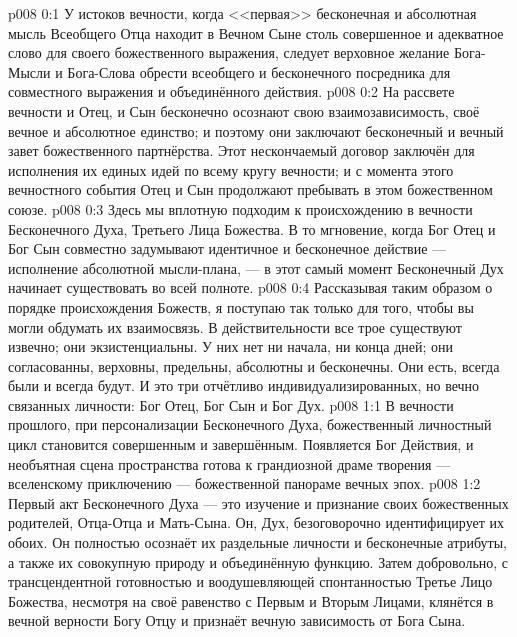 \author{Божественный Советник}
\vs p008 0:1 У истоков вечности, когда <<первая>> бесконечная и абсолютная мысль Всеобщего Отца находит в Вечном Сыне столь совершенное и адекватное слово для своего божественного выражения, следует верховное желание Бога\hyp{}Мысли и Бога\hyp{}Слова обрести всеобщего и бесконечного посредника для совместного выражения и объединённого действия.
\vs p008 0:2 На рассвете вечности и Отец, и Сын бесконечно осознают свою взаимозависимость, своё вечное и абсолютное единство; и поэтому они заключают бесконечный и вечный завет божественного партнёрства. Этот нескончаемый договор заключён для исполнения их единых идей по всему кругу вечности; и с момента этого вечностного события Отец и Сын продолжают пребывать в этом божественном союзе.
\vs p008 0:3 Здесь мы вплотную подходим к происхождению в вечности Бесконечного Духа, Третьего Лица Божества. В то мгновение, когда Бог Отец и Бог Сын совместно задумывают идентичное и бесконечное действие --- исполнение абсолютной мысли\hyp{}плана, --- в этот самый момент Бесконечный Дух начинает существовать во всей полноте.
\vs p008 0:4 \pc Рассказывая таким образом о порядке происхождения Божеств, я поступаю так только для того, чтобы вы могли обдумать их взаимосвязь. В действительности все трое существуют извечно; они экзистенциальны. У них нет ни начала, ни конца дней; они согласованны, верховны, предельны, абсолютны и бесконечны. Они есть, всегда были и всегда будут. И это три отчётливо индивидуализированных, но вечно связанных личности: Бог Отец, Бог Сын и Бог Дух.
\vs p008 1:1 В вечности прошлого, при персонализации Бесконечного Духа, божественный личностный цикл становится совершенным и завершённым. Появляется Бог Действия, и необъятная сцена пространства готова к грандиозной драме творения --- вселенскому приключению --- божественной панораме вечных эпох.
\vs p008 1:2 Первый акт Бесконечного Духа --- это изучение и признание своих божественных родителей, Отца\hyp{}Отца и Мать\hyp{}Сына. Он, Дух, безоговорочно идентифицирует их обоих. Он полностью осознаёт их раздельные личности и бесконечные атрибуты, а также их совокупную природу и объединённую функцию. Затем добровольно, с трансцендентной готовностью и воодушевляющей спонтанностью Третье Лицо Божества, несмотря на своё равенство с Первым и Вторым Лицами, клянётся в вечной верности Богу Отцу и признаёт вечную зависимость от Бога Сына.
